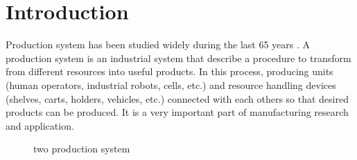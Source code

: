 \chapter{Introduction}
\setlength{\parindent}{2pc}
\label{intro}
\noindent 
Production system has been studied widely during the last 65 years \cite{papadopolous1993queueing}. A production system is an industrial system that describe a procedure to transform from different resources into useful products. In this process, producing units (human operators, industrial robots, cells, etc.) and resource handling devices (shelves, carts, holders, vehicles, etc.) connected with each others so that desired products can be produced. It is a very important part of manufacturing research and application. 



\begin{figure*}[!h]
	\centering
	\caption{two production system}
	\label{Serial productionline and assembly system.}
\end{figure*}



